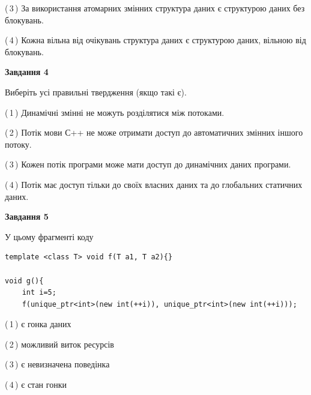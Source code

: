 \documentclass[12pt, ukrainian]{article}
\begin{document}
\begin {large}
{(\,3\,) За використання атомарних змінних структура даних є структурою даних без блокувань.%

(\,4\,) Кожна вільна від очікувань структура даних є структурою даних, вільною від блокувань.%



\begin{center}
\textbf{Завдання 4}
\end{center}
Виберіть усі правильні твердження (якщо такі є).\par
\vspace{2mm}

(\,1\,) Динамічні змінні не можуть розділятися між потоками.%

(\,2\,) Потік мови С++ не може отримати доступ до автоматичних змінних іншого потоку.%

(\,3\,) Кожен потік програми може мати доступ до динамічних даних програми.%

(\,4\,) Потік має доступ тільки до своїх власних даних та до глобальних статичних даних.%



\begin{center}
\textbf{Завдання 5}
\end{center}
У цьому фрагменті коду
\begin{verbatim}
template <class T> void f(T a1, T a2){}

void g(){
    int i=5;
    f(unique_ptr<int>(new int(++i)), unique_ptr<int>(new int(++i)));
\end{verbatim}

(\,1\,) є гонка даних%

(\,2\,) можливий виток ресурсів%

(\,3\,) є невизначена поведінка%

(\,4\,) є стан гонки%


}
\end {large}
\end{document}
